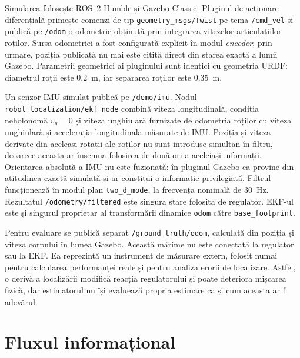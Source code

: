 \documentclass[12pt,a4paper,oneside]{report}
\begin{document}
Simularea folosește ROS~2 Humble și Gazebo Classic. Pluginul de acționare
diferențială primește comenzi de tip \texttt{geometry\_msgs/Twist} pe tema
\texttt{/cmd\_vel} și publică pe \texttt{/odom} o odometrie obținută prin
integrarea vitezelor articulațiilor roților. Sursa odometriei a fost configurată
explicit în modul \emph{encoder}; prin urmare, poziția publicată nu mai este
citită direct din starea exactă a lumii Gazebo. Parametrii geometrici ai
pluginului sunt identici cu geometria URDF: diametrul roții este \SI{0.2}{m},
iar separarea roților este \SI{0.35}{m}.

Un senzor IMU simulat publică pe \texttt{/demo/imu}. Nodul
\texttt{robot\_localization/ekf\_node} combină viteza longitudinală, condiția
neholonomă $v_y=0$ și viteza unghiulară furnizate de odometria roților cu viteza
unghiulară și accelerația longitudinală măsurate de IMU. Poziția și viteza
derivate din aceleași rotații ale roților nu sunt introduse simultan în filtru,
deoarece aceasta ar însemna folosirea de două ori a aceleiași informații.
Orientarea absolută a IMU nu este fuzionată: în pluginul Gazebo ea provine din
atitudinea exactă simulată și ar constitui o informație privilegiată. Filtrul
funcționează în modul plan \texttt{two\_d\_mode}, la frecvența nominală de
\SI{30}{Hz}. Rezultatul \texttt{/odometry/filtered} este singura stare folosită
de regulator. EKF-ul este și singurul proprietar al transformării dinamice
\texttt{odom} către \texttt{base\_footprint}.

Pentru evaluare se publică separat \texttt{/ground\_truth/odom}, calculată din
poziția și viteza corpului în lumea Gazebo. Această mărime nu este conectată la
regulator sau la EKF. Ea reprezintă un instrument de măsurare extern, folosit
numai pentru calcularea performanței reale și pentru analiza erorii de
localizare. Astfel, o derivă a localizării modifică reacția regulatorului și
poate deteriora mișcarea fizică, dar estimatorul nu își evaluează propria
estimare ca și cum aceasta ar fi adevărul.

\section{Fluxul informațional}
\end{document}
